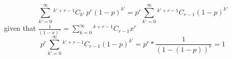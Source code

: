 \documentclass[12pt]{article}
\theoremstyle{definition}
\newcommand*{\Comb}[2]{{}^{#1}C_{#2}}%
\begin{document}
\begin{equation}
    \displaystyle \sum_{k' = 0}^{\infty} \Comb{k' + r -1}{k'} \ p^r (1-p)^{k'} =
    p^r \sum_{k'= 0}^{\infty}  \Comb{k' + r-1}{r-1}(1-p)^{k'}
\end{equation}
given that $ \displaystyle \frac{1}{(1-x)^r} = \sum_{k=0}^{\infty} \Comb{k+r-1}{r-1}x^r $
\begin{equation}
    \displaystyle p^r \sum_{k'= 0}^{\infty}  \Comb{k' + r-1}{r-1}(1-p)^{k'} = p^r * \frac{1}{(1-(1-p))^r} = 1 
\end{equation}
\end{document}

